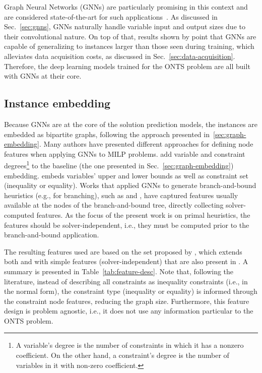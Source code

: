 Graph Neural Networks (GNNs) are particularly promising in this context and are considered state-of-the-art for such applications~\cite{cappartCombinatorialOptimizationReasoning2022}.
As discussed in Sec.~\ref{sec:gnns}, GNNs naturally handle variable input and output sizes due to their convolutional nature.
On top of that, results shown by  point that GNNs are capable of generalizing to instances larger than those seen during training, which alleviates data acquisition costs, as discussed in Sec.~\ref{sec:data-acquisition}.
Therefore, the deep learning models trained for the ONTS problem are all built with GNNs at their core.

\subsection{Instance embedding}

Because GNNs are at the core of the solution prediction models, the instances are embedded as bipartite graphs, following the approach presented in~\ref{sec:graph-embedding}.
Many authors have presented different approaches for defining node features when applying GNNs to MILP problems.
 add variable and constraint degrees\footnote{A variable's degree is the number of constraints in which it has a nonzero coefficient. On the other hand, a constraint's degree is the number of variables in it with non-zero coefficient.} to the baseline (the one presented in Sec.~\ref{sec:graph-embedding}) embedding.
 embeds variables' upper and lower bounds as well as constraint set (inequality or equality).
Works that applied GNNs to generate branch-and-bound heuristics (e.g., for branching), such as  and , have captured features usually available at the nodes of the branch-and-bound tree, directly collecting solver-computed features.
As the focus of the present work is on primal heuristics, the features should be solver-independent, i.e., they must be computed prior to the branch-and-bound application.

The resulting features used are based on the set proposed by , which extends both  and  with simple features (solver-independent) that are also present in .
A summary is presented in Table~\ref{tab:feature-desc}.
Note that, following the literature, instead of describing all constraints as inequality constraints (i.e., in the normal form), the constraint type (inequality or equality) is informed through the constraint node features, reducing the graph size.
Furthermore, this feature design is problem agnostic, i.e., it does not use any information particular to the ONTS problem.

